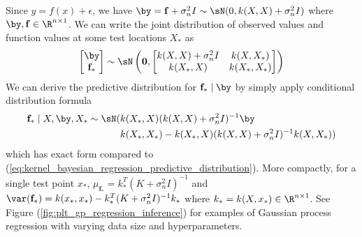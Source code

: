 \documentclass[11pt]{article}
\begin{document}
Since $y=f(x)+\epsilon$, we have $\by = \mathbf{f} + \sigma_n^2 I \sim \sN(0, k(X,X)+\sigma_n^2I)$ where $\by,\mathbf{f}\in\R^{n\times 1}$. We can write the joint distribution of observed values and function values at some test locations $X_*$ as
\begin{align}
    \begin{bmatrix}
        \by \\ \mathbf{f}_*
    \end{bmatrix}
    \sim
    \sN\left(
        \mathbf{0},
        \begin{bmatrix}
            k(X,X) + \sigma_n^2I & k(X,X_*) \\
            k(X_*,X) & k(X_*,X_*) \\ 
        \end{bmatrix}
    \right)
    \label{eq:gaussian_process_regression_noisy_model}
\end{align}
We can derive the predictive distribution for $\mathbf{f}_*\mid \by$ by simply apply conditional distribution formula
\begin{align}
    \mathbf{f}_* \mid X,\by, X_* \sim \sN(
        & k(X_*,X) (k(X,X)+\sigma_n^2 I)^{-1} \by  \\
        & k(X_*,X_*) - k(X_*,X) (k(X,X)+\sigma_n^2 I)^{-1} k(X,X_*) )
    \label{eq:gp_regression_predictive_distribution}
\end{align}
which has exact form compared to (\ref{eq:kernel_bayesian_regression_predictive_distribution}). More compactly, for a single test point $x_*$, $\mu_{\mathbf{f}_*} =  k_*^T (K+\sigma_n^2 I)^{-1}$ and $\var(\mathbf{f}_*) = k(x_*,x_*) - k_*^T (K+\sigma_n^2 I)^{-1} k_* $ where $k_* = k(X,x_*)\in \R^{n\times 1}$. See Figure (\ref{fig:plt_gp_regression_inference}) for examples of Gaussian process regression with varying data size and hyperparameters. 
\end{document}
